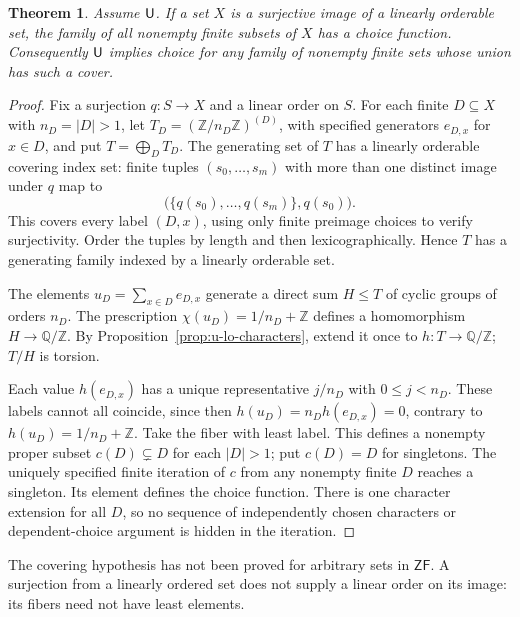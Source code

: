 \documentclass[11pt,a4paper]{article}
\newtheorem{theorem}{Theorem}[section]
\theoremstyle{definition}\newtheorem{definition}[theorem]{Definition}
\theoremstyle{remark}\newtheorem{remark}[theorem]{Remark}
\newcommand{\ZF}{\mathsf{ZF}}\newcommand{\ZFA}{\mathsf{ZFA}}
\newcommand{\Q}{\mathbb Q}\newcommand{\F}{\mathbb F}
\begin{document}
\begin{theorem}\label{thm:u-lo-cover-finite-choice}
Assume $\mathsf U$.  If a set $X$ is a surjective image of a linearly orderable
set, the family of all nonempty finite subsets of $X$ has a choice
function.  Consequently $\mathsf U$ implies choice for any family of nonempty
finite sets whose union has such a cover.
\end{theorem}
\begin{proof}
Fix a surjection $q:S\to X$ and a linear order on $S$.
For each finite $D\subseteq X$ with $n_D=|D|>1$, let
$T_D=(\mathbb Z/n_D\mathbb Z)^{(D)}$, with specified generators
$e_{D,x}$ for $x\in D$, and put $T=\bigoplus_D T_D$.
The generating set of $T$ has a linearly orderable covering index set:
finite tuples $(s_0,\ldots,s_m)$ with more than one distinct image under
$q$ map to
\[
  \bigl(\{q(s_0),\ldots,q(s_m)\},q(s_0)\bigr).
\]
This covers every label $(D,x)$, using only finite preimage choices to
verify surjectivity.  Order the tuples by length and then
lexicographically.  Hence $T$ has a generating family indexed by a
linearly orderable set.

The elements $u_D=\sum_{x\in D}e_{D,x}$ generate a direct sum
$H\leq T$ of cyclic groups of orders $n_D$.
The prescription $\chi(u_D)=1/n_D+\mathbb Z$ defines a homomorphism
$H\to\Q/\mathbb Z$.  By Proposition~\ref{prop:u-lo-characters},
extend it once to $h:T\to\Q/\mathbb Z$; $T/H$ is torsion.

Each value $h(e_{D,x})$ has a unique representative
$j/n_D$ with $0\leq j<n_D$.  These labels cannot all coincide, since
then $h(u_D)=n_Dh(e_{D,x})=0$, contrary to $h(u_D)=1/n_D+\mathbb Z$.
Take the fiber with least label.  This defines a nonempty proper subset
$c(D)\subsetneq D$ for each $|D|>1$; put $c(D)=D$ for singletons.
The uniquely specified finite iteration of $c$ from any nonempty finite
$D$ reaches a singleton.  Its element defines the choice function.
There is one character extension for all $D$, so no sequence of
independently chosen characters or dependent-choice argument is hidden
in the iteration.
\end{proof}

The covering hypothesis has not been proved for arbitrary sets in
$\ZF$.  A surjection from a linearly ordered set does not supply a
linear order on its image: its fibers need not have least elements.
\end{document}
